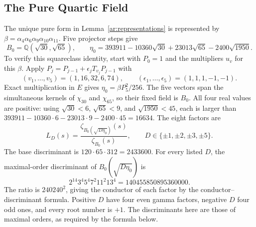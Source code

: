\subsection{The Pure Quartic Field}
The unique pure form in Lemma~\ref{ar:representations} is represented
by $\beta=\alpha_4\alpha_6\alpha_9\alpha_{10}\alpha_{11}$.
Five projector steps give
\[
 B_0=\mathbb Q(\sqrt{30},\sqrt{65}),\qquad
 \eta_0=393911-10360\sqrt{30}+23013\sqrt{65}-2400\sqrt{1950}.
\]
To verify this squareclass identity, start with $P_0=1$ and the
multipliers $u_v$ for this $\beta$. Apply
$P_j=P_{j-1}+\epsilon_jT_{v_j}P_{j-1}$ with
\[
 (v_1,\ldots,v_5)=(1,16,32,6,74),\qquad
 (\epsilon_1,\ldots,\epsilon_5)=(1,1,1,-1,-1).
\]
Exact multiplication in $E$ gives $\eta_0=\beta P_5^2/256$.
The five vectors span the simultaneous kernels of $\chi_{30}$ and
$\chi_{65}$, so their fixed field is $B_0$. All four real values are
positive: using $\sqrt{30}<6$, $\sqrt{65}<9$, and $\sqrt{1950}<45$,
each is larger than
$393911-10360\cdot6-23013\cdot9-2400\cdot45=16634$. The eight factors are
\begin{equation}\label{ar:pure-factors}
 L_D(s)=\frac{\zeta_{B_0(\sqrt{D\eta_0})}(s)}{\zeta_{B_0}(s)},
 \qquad D\in\{\pm1,\pm2,\pm3,\pm5\}.
\end{equation}
The base discriminant is
$120\cdot65\cdot312=2433600$. For every listed $D$, the maximal-order
discriminant of $B_0(\sqrt{D\eta_0})$ is
\[
 2^{14}3^4 5^4 7^2 11^2 13^4=140455850895360000.
\]
The ratio is $240240^2$, giving the conductor of each factor by the
conductor--discriminant formula. Positive $D$ have four even gamma
factors, negative $D$ four odd ones, and every root number is $+1$.
The discriminants here are those of maximal orders, as required by the
formula below.

